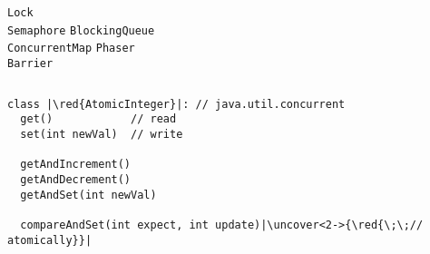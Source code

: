 
\begin{frame}{}
    {\vspace{0.30cm}\centerline{\Large {}}}
\end{frame}

\begin{frame}{}
    {\vspace{0.30cm}\centerline{\Large {}}}
\end{frame}

\begin{frame}{}
  \begin{columns}
  \end{columns}

  \vspace{1.00cm}
  \centerline{\Large {}}

  \pause
  \vspace{0.60cm}
  \begin{columns}
      \texttt{\quad\qquad Lock} \\
      \texttt{\quad\qquad Semaphore}
      \texttt{\quad BlockingQueue} \\
      \texttt{\quad ConcurrentMap}
      \texttt{\qquad Phaser} \\
      \texttt{\qquad Barrier}
  \end{columns}
\end{frame}

\begin{frame}[fragile]{}
  \begin{lstlisting}[style = CStyle]
class |\red{AtomicInteger}|: // java.util.concurrent
  get()            // read
  set(int newVal)  // write

  getAndIncrement()
  getAndDecrement()
  getAndSet(int newVal)

  compareAndSet(int expect, int update)|\uncover<2->{\red{\;\;// atomically}}|
  \end{lstlisting}
\end{frame}

